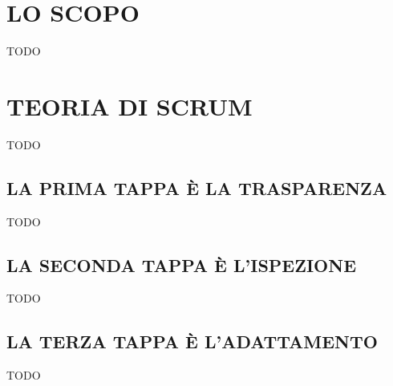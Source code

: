 \newpage
\section*{LO SCOPO}
\label{sec:purpose}
TODO

\section*{TEORIA  DI SCRUM}
\label{sec:scrum_theory}
TODO

\subsection*{LA PRIMA  TAPPA  \`E LA TRASPARENZA}
\label{sec:transparency}
TODO

\subsection*{LA  SECONDA  TAPPA \`E  L'ISPEZIONE}
\label{sec:inspection}
TODO

\subsection*{LA TERZA  TAPPA \`E  L'ADATTAMENTO}
\label{sec:adaption}
TODO
